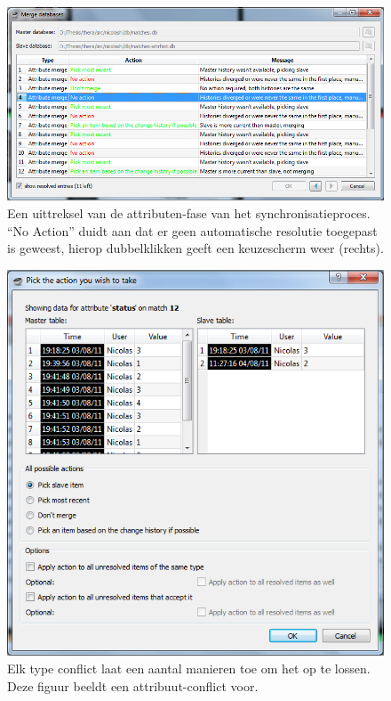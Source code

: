 \begin{figure}[ht]
	\begin{center}
		\includegraphics[width=1.0\columnwidth]{images/merge-action-1-small.png}
		\caption{Een uittreksel van de attributen-fase van het synchronisatieproces. ``No Action''  duidt aan dat er geen automatische resolutie toegepast is geweest, hierop dubbelklikken geeft een keuzescherm weer (rechts).}
		\label{fig:merge-attrib}
	\end{center}
\end{figure}

\begin{figure}[ht]
	\begin{center}
		\includegraphics[width=0.5\columnwidth]{images/merge-action-2-small.png}
		\caption{Elk type conflict laat een aantal manieren toe om het op te lossen. Deze figuur beeldt een attribuut-conflict voor.}
		\label{fig:merge-choose}
	\end{center}
\end{figure}



